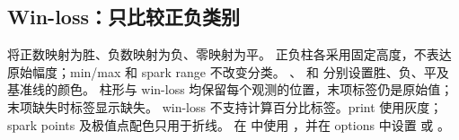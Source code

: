 \subsection{Win-loss：只比较正负类别}
 将正数映射为胜、负数映射为负、零映射为平。
正负柱各采用固定高度，不表达原始幅度；min/max 和 spark range 不改变分类。
、 和  分别设置胜、负、平及基准线的颜色。
柱形与 win-loss 均保留每个观测的位置，末项标签仍是原始值；末项缺失时标签显示缺失。
win-loss 不支持计算百分比标签。print 使用灰度；spark points 及极值点配色只用于折线。
在  中使用 ，并在 options 中设置  或 。
